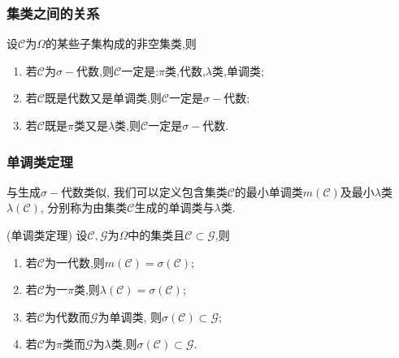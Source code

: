   \begin{frame}
	\frametitle{集类之间的关系}
	\begin{thm}
	  设$\mathcal{C}$为$\Omega$的某些子集构成的非空集类,则
	  \begin{enumerate}
	  \item 若$\mathcal{C}$为$\sigma-$代数,则$\mathcal{C}$一定是:$\pi$类,代数,$\lambda$类,单调类;
	  \item 若$\mathcal{C}$既是代数又是单调类,则$\mathcal{C}$一定是$\sigma-$代数;
	  \item 若$\mathcal{C}$既是$\pi$类又是$\lambda$类,则$\mathcal{C}$一定是$\sigma-$代数.
	  \end{enumerate}

	\end{thm}

  \end{frame}
  \begin{frame}
	\frametitle{单调类定理}
	\begin{defi}
	  与生成$\sigma-$代数类似, 我们可以定义包含集类$\mathcal{C}$的最小单调类$m(\mathcal{C})$及最小$\lambda$类$\lambda(\mathcal{C})$, 分别称为由集类$\mathcal{C}$生成的单调类与$\lambda$类.
	\end{defi}
  \vspace{0.2cm}
  \pause
	\begin{thm}(单调类定理) 设$\mathcal{C},\mathcal{G}$为$\Omega$中的集类且$\mathcal{C}\subset \mathcal{G}$,则
	  \begin{enumerate}
	  \item 若$\mathcal{C}$为一代数,则$m(\mathcal{C})=\sigma(\mathcal{C})$;
	  \item 若$\mathcal{C}$为一$\pi$类,则$\lambda(\mathcal{C})=\sigma(\mathcal{\mathcal{C}})$;
	  \item 若$\mathcal{C}$为代数而$\mathcal{G}$为单调类, 则$\sigma(\mathcal{C})\subset \mathcal{G}$;
	  \item 若$\mathcal{C}$为$\pi$类而$\mathcal{G}$为$\lambda$类,则$\sigma(\mathcal{C})\subset \mathcal{G}$.
	  \end{enumerate}
	\end{thm}
  \end{frame}


